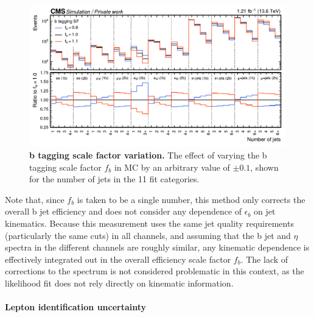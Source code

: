 \begin{figure}[ht]
    \centering
    \includegraphics[width=0.99\textwidth]{figures/ttxs/scalefactors/btagsf.pdf}
    \caption{
       \textbf{b tagging scale factor variation.} The effect of varying the b tagging scale factor $f_b$ in \ttbar MC by an arbitrary value of $\pm 0.1$, shown for the number of jets in the 11 fit categories.
    }
    \label{fig:ttxs:btagsf}
\end{figure}

Note that, since $f_b$ is taken to be a single number, this method only corrects the overall b jet efficiency and does not consider any dependence of $\epsilon_b$ on jet kinematics. Because this measurement uses the same jet quality requirements (particularly the same \pt cuts) in all channels, and assuming that the b jet \pt and $\eta$ spectra in the different channels are roughly similar, any kinematic dependence is effectively integrated out in the overall efficiency scale factor $f_b$. %
The lack of corrections to the spectrum is not considered problematic in this context, as the likelihood fit does not rely directly on kinematic information.

\paragraph{Lepton identification uncertainty}


